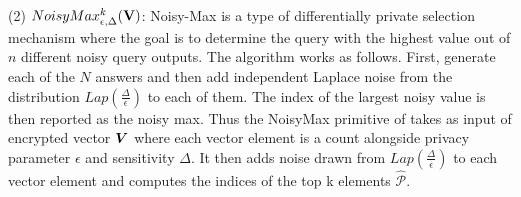 (2) $NoisyMax_{\epsilon,\Delta}^k(\mathbf{V})$:  Noisy-Max is a type of differentially private selection mechanism \cite{Dork} where the goal is to determine the query with the highest value out of $n$ different noisy query outputs. The algorithm works as follows. First, generate each of the $N$ answers and then add independent Laplace noise from the distribution $Lap(\frac{\Delta}{\epsilon})$ 
to each of them. The index of the largest noisy value is then reported as the noisy max. %
 Thus the \textsf{NoisyMax} primitive of \system takes as input of encrypted vector $\boldsymbol{V}$ where each vector element is a count alongside privacy parameter $\epsilon$ and sensitivity $\Delta$. It then adds noise drawn from $Lap(\frac{\Delta}{\epsilon})$ to each vector element and computes the indices of the top k elements $\hat{\mathcal{P}}$.





